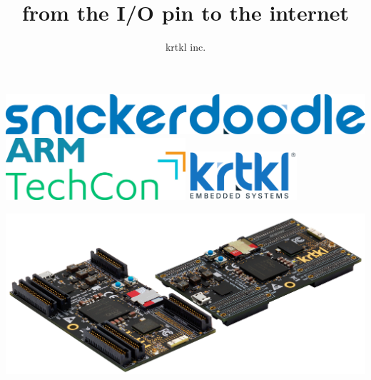 
%
%
\title{from the I/O pin to the internet}
\author{krtkl inc.}

\makeatletter


\setcounter{secnumdepth}{2}




  	\newpage
  	\thispagestyle{plain}
  	\begin{fullwidth}
      		\includegraphics{./images/Snickerdoodle_Logo.pdf}
		\break
		\break
		\break
 		\includegraphics[width=0.5\textwidth]{images/armtechcon.png}
		\hfill
		\includegraphics[width=0.3\textwidth]{images/krtkl.pdf}
    	\end{fullwidth}
  
	\begingroup
		\setlength{\parindent}{0em}
		\setlength{\baselineskip}{2em}
		\setlength{\parskip}{2em}
		\begingroup
      			\par{\LARGE\allcaps{\@title}}
  	 		   	\ifthenelse{\equal{\@author}{}}{}{\par{\Large\allcaps{\@author}}}
    		\endgroup
  		\par
	\endgroup
	\vspace{8em}
	\begin{fullwidth}
		\centering
		\includegraphics[width=45em]{images/cover_art.png}
	\end{fullwidth}

\newpage

	
	
	
		



